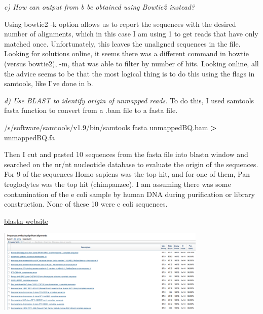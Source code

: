 \documentclass[]{article}
\newenvironment{Shaded}{\begin{snugshade}}{\end{snugshade}}
\newcommand{\CommentTok}[1]{\textcolor[rgb]{0.56,0.35,0.01}{\textit{#1}}}
\newcommand{\VariableTok}[1]{\textcolor[rgb]{0.00,0.00,0.00}{#1}}
\newcommand{\OperatorTok}[1]{\textcolor[rgb]{0.81,0.36,0.00}{\textbf{#1}}}
\newcommand{\BuiltInTok}[1]{#1}
\newcommand{\ExtensionTok}[1]{#1}
\newcommand{\NormalTok}[1]{#1}
\begin{document}
\emph{c) How can output from b be obtained using Bowtie2 instead?}

Using bowtie2 -k option allows us to report the sequences with the
desired number of alignments, which in this case I am using 1 to get
reads that have only matched once. Unfortunately, this leaves the
unaligned sequences in the file. Looking for solutions online, it seems
there was a different command in bowtie (versus bowtie2), -m, that was
able to filter by number of hits. Looking online, all the advice seems
to be that the most logical thing is to do this using the flags in
samtools, like I've done in b.

\begin{Shaded}
\end{Shaded}

\emph{d) Use BLAST to identify origin of unmapped reads.} To do this, I
used samtools fasta function to convert from a .bam file to a fasta
file.

\begin{Shaded}
\begin{Highlighting}[]
\ExtensionTok{/s/software/samtools/v1.9/bin/samtools}\NormalTok{ fasta unmappedBQ.bam }\OperatorTok{>}\NormalTok{ unmappedBQ.fa}
\end{Highlighting}
\end{Shaded}

Then I cut and pasted 10 sequences from the fasta file into blastn
window and searched on the nr/nt nucleotide database to evaluate the
origin of the sequences. For 9 of the sequences Homo sapiens was the top
hit, and for one of them, Pan troglodytes was the top hit (chimpanzee).
I am assuming there was some contamination of the e coli sample by human
DNA during purification or library construction. None of these 10 were e
coli sequences.

\href{https://blast.ncbi.nlm.nih.gov}{blastn website}

\includegraphics[width=0.75000\textwidth]{blast.png}\\
\end{document}
